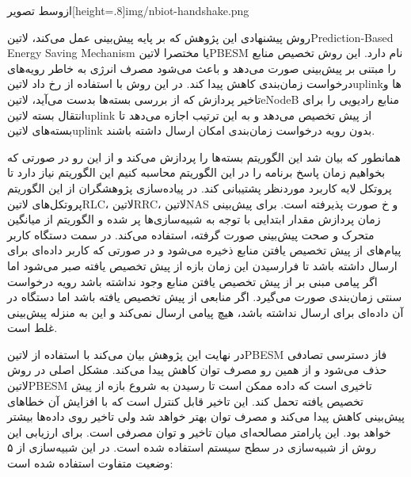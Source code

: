 ‌ازوسط
‌تصویر[height=.8\textwidth]{img/nbiot-handshake.png}

روش پیشنهادی این پژوهش که بر پایه پیش‌بینی عمل می‌کند، ‌لاتین{Prediction-Based Energy Saving Mechanism} یا مختصرا ‌لاتین{PBESM} نام دارد.
این روش تخصیص منابع را مبتنی بر پیش‌بینی صورت می‌دهد و باعث می‌شود مصرف انرژی به خاطر رویه‌های درخواست زمان‌بندی کاهش پیدا کند.
در این روش با استفاده از رخ داد ‌لاتین{uplink}ها و تاخیر پردازش که از بررسی بسته‌ها بدست می‌آید، ‌لاتین{eNodeB}
منابع رادیویی را برای انتقال بسته ‌لاتین{uplink} از پیش تخصیص می‌دهد و به این ترتیب اجازه می‌دهد تا بسته‌های ‌لاتین{uplink}
بدون رویه درخواست زمان‌بندی امکان ارسال داشته باشند.

همانطور که بیان شد این الگوریتم بسته‌ها را پردازش می‌کند و از این رو در صورتی که بخواهیم زمان پاسخ برنامه را در این الگوریتم محاسبه کنیم این الگوریتم نیاز دارد تا پروتکل لایه کاربرد
موردنظر پشتیبانی کند. در پیاده‌سازی پژوهشگران از این الگوریتم پروتکل‌های ‌لاتین{RLC}، ‌لاتین{RRC}، ‌لاتین{NAS} و ‌خ صورت پذیرفته است.
برای پیش‌بینی زمان پردازش مقدار ابتدایی با توجه به شبیه‌سازی‌ها پر شده و الگوریتم از میانگین متحرک و صحت پیش‌بینی صورت گرفته، استفاده می‌کند.
در سمت دستگاه کاربر پیام‌های از پیش تخصیص یافتن منابع ذخیره می‌شود و در صورتی که کاربر داده‌ای برای ارسال داشته باشد تا فرارسیدن این زمان بازه از پیش تخصیص یافته
صبر می‌شود اما اگر پیامی مبنی بر از پیش تخصیص یافتن منابع وجود نداشته باشد رویه درخواست سنتی زمان‌بندی صورت می‌گیرد. اگر منابعی از پیش تخصیص یافته باشد اما دستگاه
در آن داده‌ای برای ارسال نداشته باشد، هیچ پیامی ارسال نمی‌کند و این به منزله پیش‌بینی غلط است.

در نهایت این پژوهش بیان می‌کند با استفاده از ‌لاتین{PBESM} فاز دسترسی تصادفی حذف می‌شود و از همین رو مصرف توان کاهش پیدا می‌کند.
مشکل اصلی در روش ‌لاتین{PBESM} تاخیری است که داده ممکن است تا رسیدن به شروع بازه از پیش تخصیص یافته تحمل کند.
این تاخیر قابل کنترل است که با افزایش آن خطاهای پیش‌بینی کاهش پیدا می‌کند و مصرف توان بهتر خواهد شد ولی تاخیر روی داده‌ها بیشتر خواهد بود.
این پارامتر مصالحه‌ای میان تاخیر و توان مصرفی است. برای ارزیابی این روش از شبیه‌سازی در سطح سیستم استفاده شده است.
در این شبیه‌سازی از ۵ وضعیت متفاوت استفاده شده است:

